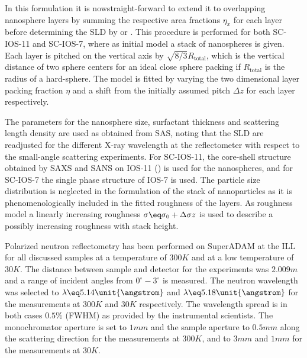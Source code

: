 \documentclass[\main/dresen_thesis.tex]{subfiles}
\begin{document}
    In this formulation it is nowstraight-forward to extend it to overlapping nanosphere layers by summing the respective area fractions $\eta_x$ for each layer before determining the SLD by  or .
    This procedure is performed for both SC-IOS-11 and SC-IOS-7, where as initial model a stack of nanospheres is given.
    Each layer is pitched on the vertical axis by $\sqrt{8/3} R_\mathrm{total}$, which is the vertical distance of two sphere centers for an ideal close sphere packing if $R_\mathrm{total}$ is the radius of a hard-sphere.
    The model is fitted by varying the two dimensional layer packing fraction $\eta$ and a shift from the initially assumed pitch $\Delta z$ for each layer respectively.

    The parameters for the nanosphere size, surfactant thickness and scattering length density are used as obtained from SAS, noting that the SLD are readjusted for the different X-ray wavelength at the reflectometer with respect
    to the small-angle scattering experiments.
    For SC-IOS-11, the core-shell structure obtained by SAXS and SANS on IOS-11 () is used for the nanospheres, and for SC-IOS-7 the single phase structure of IOS-7 is used.
    The particle size distribution is neglected in the formulation of the stack of nanoparticles as it is phenomenologically included in the fitted roughness of the layers.
    As roughness model a linearly increasing roughness $\sigma \eq \sigma_0 + \Delta \sigma z$ is used to describe a possibly increasing roughness with stack height.

    Polarized neutron reflectometry has been performed on SuperADAM at the ILL for all discussed samples at a temperature of $300 \unit{K}$ and at a low temperature of $30 \unit{K}$.
    The distance between sample and detector for the experiments was $2.009 \unit{m}$ and a range of incident angles from $0 ^\circ - 3 ^\circ$ is measured.
    The neutron wavelength was selected to $\lambda \eq 5.14 \unit{\angstrom}$ and $\lambda \eq 5.18 \unit{\angstrom}$ for the measurements at $300 \unit{K}$ and $30 \unit{K}$ respectively.
    The wavelength spread is in both cases $0.5 \%$ (FWHM) as provided by the instrumental scientists.
    The monochromator aperture is set to $1 \unit{mm}$ and the sample aperture to $0.5 \unit{mm}$ along the scattering direction for the measurements at $300 \unit{K}$, and to $3 \unit{mm}$ and $1 \unit{mm}$ for the measurements at $30 \unit{K}$.
\end{document}
